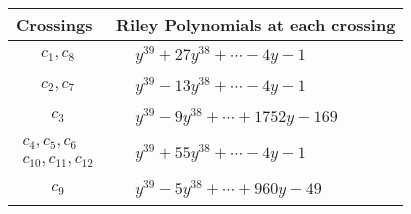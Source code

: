\documentclass[1p]{elsarticle_modified}
\theoremstyle{definition}
\begin{document}
\begin{tabular}{m{50pt}|m{274pt}}
Crossings & \hspace{64pt}Riley Polynomials at each crossing \\
\hline $$\begin{aligned}c_{1},c_{8}\end{aligned}$$&$\begin{aligned}
&y^{39}+27 y^{38}+\cdots-4 y-1
\end{aligned}$\\
\hline $$\begin{aligned}c_{2},c_{7}\end{aligned}$$&$\begin{aligned}
&y^{39}-13 y^{38}+\cdots-4 y-1
\end{aligned}$\\
\hline $$\begin{aligned}c_{3}\end{aligned}$$&$\begin{aligned}
&y^{39}-9 y^{38}+\cdots+1752 y-169
\end{aligned}$\\
\hline $$\begin{aligned}c_{4},c_{5},c_{6}\\c_{10},c_{11},c_{12}\end{aligned}$$&$\begin{aligned}
&y^{39}+55 y^{38}+\cdots-4 y-1
\end{aligned}$\\
\hline $$\begin{aligned}c_{9}\end{aligned}$$&$\begin{aligned}
&y^{39}-5 y^{38}+\cdots+960 y-49
\end{aligned}$\\
\hline
\end{tabular}
\vskip 2pc
\end{document}
